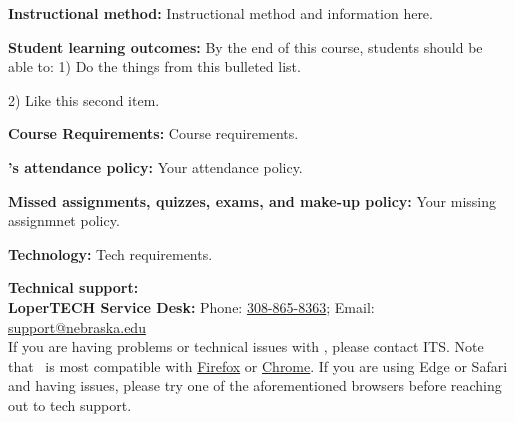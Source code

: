 \documentclass[11pt]{article}
\begin{document}
	\skippers
	\noindent\textbf{Instructional method:} Instructional method and information here.
	
	\skippers
	\noindent\textbf{Student learning outcomes:} 
	By the end of this course, students should be able to:
	\vskip0.025in
	1)	Do the things from this bulleted list.
	
	2)	Like this second item.
	
	\skippers
	\noindent\textbf{Course Requirements:} Course requirements.
	
	\skippers
	\noindent\textbf{\shortname's attendance policy:} Your attendance policy.
	
	\skippers
	\noindent\textbf{Missed assignments, quizzes, exams, and make-up policy:} Your missing assignmnet policy.\\
	 
	 \skippers
	
	
	\skippers
	\noindent\textbf{Technology:} Tech requirements.
	
	\skippers
	\noindent\textbf{Technical support:} \\
	\textbf{LoperTECH Service Desk:} Phone: \href{tel:13088658363}{308-865-8363}; Email: \href{mailto:support@nebraska.edu}{support@nebraska.edu}\\
	
	\noindent If you are having problems or technical issues with \canvas, please contact ITS. Note that \canvas\ is most compatible with \href{https://www.mozilla.org/en-US/firefox/new/}{Firefox} or \href{https://www.google.com/chrome/}{Chrome}. If you are using Edge or Safari and having issues, please try one of the aforementioned browsers before reaching out to tech support.
	
\end{document}
